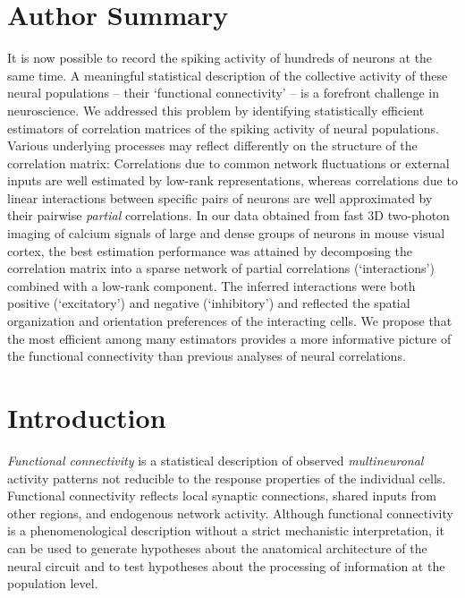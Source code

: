 \section*{Author Summary}
It is now possible to record the spiking activity of hundreds of neurons at the same time.  A meaningful statistical description of the collective activity of these neural populations -- their `functional connectivity' -- is a forefront challenge in neuroscience.  We addressed this problem by identifying statistically efficient estimators of correlation matrices of the spiking activity of neural populations.  Various underlying processes may reflect differently on the structure of the correlation matrix:  Correlations due to common network fluctuations or external inputs are well estimated by low-rank representations, whereas correlations due to linear interactions between specific pairs of neurons are well approximated by their pairwise \emph{partial} correlations.  In our data obtained from fast 3D two-photon imaging of calcium signals of large and dense groups of neurons in mouse visual cortex, the best estimation performance was attained by decomposing the correlation matrix into a sparse network of partial correlations (`interactions') combined with a low-rank component. The inferred interactions were both positive (`excitatory') and negative (`inhibitory') and reflected the spatial organization and orientation preferences of the interacting cells.  We propose that  the most efficient among many estimators provides a more informative picture of the functional connectivity than previous analyses of neural correlations.


\section*{Introduction}
\emph{Functional connectivity} is a statistical description of observed \emph{multineuronal} activity patterns not reducible to the response properties of the individual cells. Functional connectivity reflects local synaptic connections, shared inputs from other regions, and endogenous network activity. Although functional connectivity is a phenomenological description without a strict mechanistic interpretation, it can be used to generate hypotheses about the anatomical architecture of the neural circuit and to test hypotheses about the processing of information at the population level.


